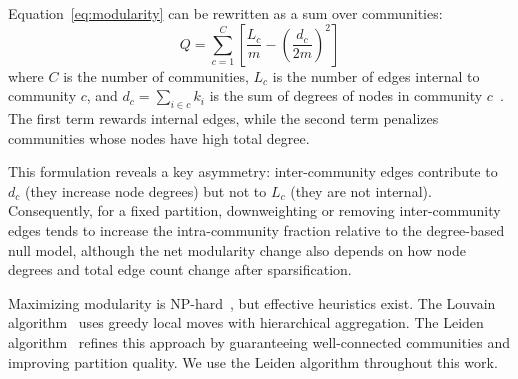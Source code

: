 \documentclass[10pt,journal,compsoc]{IEEEtran}
\begin{document}
Equation~\eqref{eq:modularity} can be rewritten as a sum over communities:
\begin{equation}
Q = \sum_{c=1}^{C} \left[ \frac{L_c}{m} - \left( \frac{d_c}{2m} \right)^2 \right]
\label{eq:modularity-community}
\end{equation}
where $C$ is the number of communities, $L_c$ is the number of edges 
internal to community $c$, and $d_c = \sum_{i \in c} k_i$ is the sum of 
degrees of nodes in community $c$~\cite{newman2006modularity}. The first 
term rewards internal edges, while the second term penalizes communities whose 
nodes have high total degree.

This formulation reveals a key asymmetry: inter-community edges contribute 
to $d_c$ (they increase node degrees) but not to $L_c$ (they are not 
internal). Consequently, for a fixed partition, downweighting or removing inter-community edges tends to increase the intra-community fraction relative to the degree-based null model, although the net modularity change also depends on how node degrees and total edge count change after sparsification.

Maximizing modularity is NP-hard~\cite{brandes2007modularity}, but effective 
heuristics exist. The Louvain algorithm~\cite{blondel2008fast} uses greedy 
local moves with hierarchical aggregation. The Leiden 
algorithm~\cite{traag2019louvain} refines this approach by guaranteeing 
well-connected communities and improving partition quality. We use the 
Leiden algorithm throughout this work.

\end{document}
